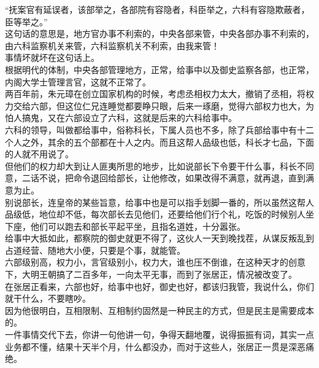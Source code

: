 \begin{multicols}{\theparacolNo}
“抚案官有延误者，该部举之，各部院有容隐者，科臣举之，六科有容隐欺蔽者，臣等举之。”\\

这句话的意思是，地方官办事不利索的，中央各部来管，中央各部办事不利索的，由六科监察机关来管，六科监察机关不利索，由我来管！\\

事情坏就坏在这句话上。\\

根据明代的体制，中央各部管理地方，正常，给事中以及御史监察各部，也正常，内阁大学士管理言官，这就不正常了。\\

两百年前，朱元璋在创立国家机构的时候，考虑丞相权力太大，撤销了丞相，将权力交给六部，但这位仁兄连睡觉都要睁只眼，后来一琢磨，觉得六部权力也大，为怕人搞鬼，又在六部设立了六科，这就是后来的六科给事中。\\

六科的领导，叫做都给事中，俗称科长，下属人员也不多，除了兵部给事中有十二个人之外，其余的五个部都在十人之内。而且这帮人品级也低，科长才七品，下面的人就不用说了。\\

但他们的权力却大到让人匪夷所思的地步，比如说部长下令要干什么事，科长不同意，二话不说，把命令退回给部长，让他修改，如果改得不满意，就再退，直到满意为止。\\

别说部长，连皇帝的某些旨意，给事中也是可以指手划脚一番的，所以虽然这帮人品级低，地位却不低，每次部长去见他们，还要给他们行个礼，吃饭的时候别人坐下座，他们可以跑去和部长平起平坐，且指名道姓，十分嚣张。\\

给事中大抵如此，都察院的御史就更不得了，这伙人一天到晚找茬，从谋反叛乱到占道经营、随地大小便，只要是个事，就能管。\\

六部级别高，权力小，言官级别小，权力大，谁也压不倒谁，在这种天才的创意下，大明王朝搞了二百多年，一向太平无事，而到了张居正，情况被改变了。\\

在张居正看来，六部也好，给事中也好，御史也好，都该归我管，我说什么，你们就干什么，不要瞎吵。\\

因为他很明白，互相限制、互相制约固然是一种民主的方式，但是民主是需要成本的。\\

一件事情交代下去，你讲一句他讲一句，争得天翻地覆，说得振振有词，其实一点业务都不懂，结果十天半个月，什么都没办，而对于这些人，张居正一贯是深恶痛绝。\\


\end{multicols}

